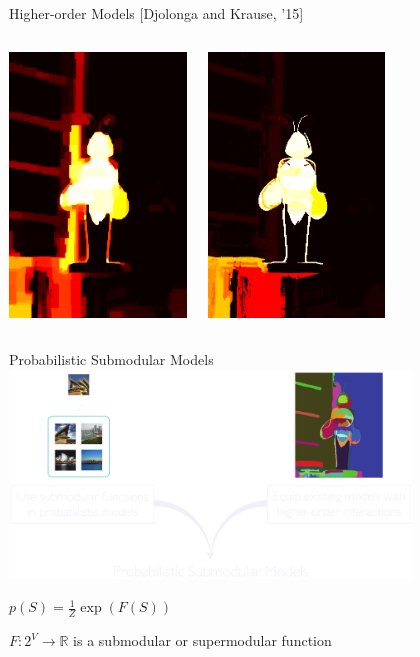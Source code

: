 \documentclass[mathserif]{beamer}
\newcommand{\qcite}[1]{{\scriptsize\color{col2}[#1]}}
\newcommand{\qboxa}[1]{%
\begin{tcolorbox}[enhanced jigsaw,size=tight,hbox,boxsep=4pt,boxrule=1pt,coltext=textcolor,colframe=col1,opacityback=0,opacityframe=1]
\strut #1
\end{tcolorbox}%
}
\begin{document}
\begin{frame}{Higher-order Models \qcite{Djolonga and Krause, '15}}
\vspace{0.5em}
\begin{columns}[c]
\centering
\includegraphics[width=1.85in]{figures/bee_dr1.png}

\centering
\includegraphics[width=1.85in]{figures/bee_marginals.png}
\end{columns}
\end{frame}

\begin{frame}{Probabilistic Submodular Models}
\vspace{0.5em}
\centering
\includegraphics[width=4.2in]{figures/psm.pdf}

\vspace{0.5em}
\qboxa{$p(S) = \displaystyle\frac{1}{Z} \exp(F(S))$} $F : 2^V \to \mathbb{R}$ is a submodular or supermodular function
\end{frame}
\end{document}
